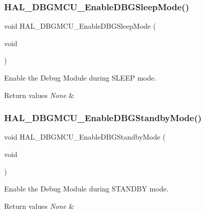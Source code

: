 \subsubsection{\texorpdfstring{HAL\_DBGMCU\_EnableDBGSleepMode()}{HAL\_DBGMCU\_EnableDBGSleepMode()}}
{\footnotesize\ttfamily void H\+A\+L\+\_\+\+D\+B\+G\+M\+C\+U\+\_\+\+Enable\+D\+B\+G\+Sleep\+Mode (\begin{DoxyParamCaption}\item[{void}]{ }\end{DoxyParamCaption})}



Enable the Debug Module during S\+L\+E\+EP mode. 


\begin{DoxyRetVals}{Return values}
{\em None} & \\
\hline
\end{DoxyRetVals}
\mbox{\label{group___h_a_l___exported___functions___group2_ga28a1323b2eeb0a408c1cfdbfa0db5ead}} 
\subsubsection{\texorpdfstring{HAL\_DBGMCU\_EnableDBGStandbyMode()}{HAL\_DBGMCU\_EnableDBGStandbyMode()}}
{\footnotesize\ttfamily void H\+A\+L\+\_\+\+D\+B\+G\+M\+C\+U\+\_\+\+Enable\+D\+B\+G\+Standby\+Mode (\begin{DoxyParamCaption}\item[{void}]{ }\end{DoxyParamCaption})}



Enable the Debug Module during S\+T\+A\+N\+D\+BY mode. 


\begin{DoxyRetVals}{Return values}
{\em None} & \\
\hline
\end{DoxyRetVals}
\mbox{\label{group___h_a_l___exported___functions___group2_gadf25043b17de4bef38a95a75fd03e5c4}} 
